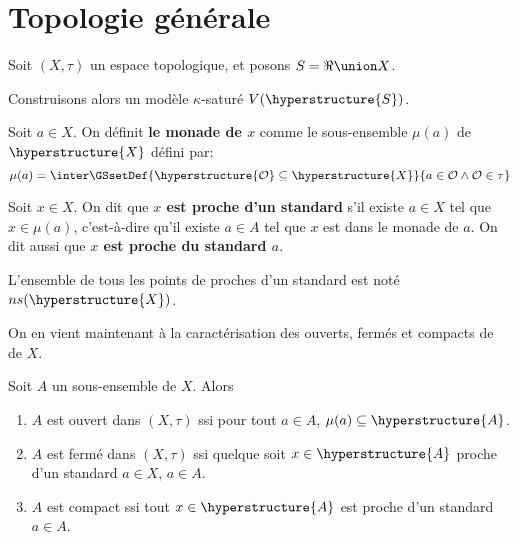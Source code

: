 \documentclass[a4paper, 12pt]{report}
\begin{document}
\section{Topologie générale}

Soit $(X, \tau)$ un espace topologique, et posons $S = \real \union X$.

Construisons alors un modèle $\kappa$-saturé $V(\hyperstructure{S})$.

\begin{definition}
	Soit $a \in X$. On définit \textbf{le monade de $x$} comme le sous-ensemble
	$\mu(a)$ de $\hyperstructure{X}$ défini par:
	\begin{equation}
		\mu(a) = \inter \GSsetDef{\hyperstructure{\mathcal{O}} \subseteq
		\hyperstructure{X}}{a \in \mathcal{O} \wedge \mathcal{O} \in \tau}
	\end{equation}
\end{definition}

\begin{definition}
	Soit $x \in X$. On dit que \textbf{$x$ est proche d'un standard} s'il existe
	$a \in X$ tel que $x \in \mu(a)$, c'est-à-dire qu'il existe $a \in A$ tel
	que $x$ est dans le monade de $a$. On dit aussi que \textbf{$x$ est proche du
	standard $a$}.

	L'ensemble de tous les points de proches d'un standard est noté
	$ns(\hyperstructure{X})$.
\end{definition}

On en vient maintenant à la caractérisation des ouverts, fermés et compacts de
de $X$.

\begin{proposition}
	Soit $A$ un sous-ensemble de $X$. Alors
	\begin{enumerate}
		\item $A$ est ouvert dans $(X, \tau)$ ssi pour tout $a \in A$, $\mu(a)
			\subseteq \hyperstructure{A}$.
		\item $A$ est fermé dans $(X, \tau)$ ssi quelque soit $x \in
			\hyperstructure{A}$ proche d'un standard $a \in X$, $a \in A$.
		\item $A$ est compact ssi tout $x \in \hyperstructure{A}$ est proche
			d'un standard $a \in A$.
	\end{enumerate}
\end{proposition}
\end{document}
